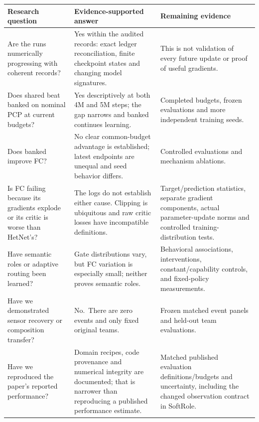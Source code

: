 \documentclass[
  10pt,
]{article}
\begin{document}
\begin{longtable}[]{@{}
  >{\raggedright\arraybackslash}p{}
  >{\raggedright\arraybackslash}p{}
  >{\raggedright\arraybackslash}p{}@{}}
\toprule\noalign{}
\begin{minipage}[b]{\linewidth}\raggedright
Research question
\end{minipage} & \begin{minipage}[b]{\linewidth}\raggedright
Evidence-supported answer
\end{minipage} & \begin{minipage}[b]{\linewidth}\raggedright
Remaining evidence
\end{minipage} \\
\midrule\noalign{}
\endhead
\bottomrule\noalign{}
\endlastfoot
Are the runs numerically progressing with coherent records? & Yes within
the audited records: exact ledger reconciliation, finite checkpoint
states and changing model signatures. & This is not validation of every
future update or proof of useful gradients. \\
Does shared beat banked on nominal PCP at current budgets? & Yes
descriptively at both 4M and 5M steps; the gap narrows and banked
continues learning. & Completed budgets, frozen evaluations and more
independent training seeds. \\
Does banked improve FC? & No clear common-budget advantage is
established; latest endpoints are unequal and seed behavior differs. &
Controlled evaluations and mechanism ablations. \\
Is FC failing because its gradients explode or its critic is worse than
HetNet's? & The logs do not establish either cause. Clipping is
ubiquitous and raw critic losses have incompatible definitions. &
Target/prediction statistics, separate gradient components, actual
parameter-update norms and controlled training-distribution tests. \\
Have semantic roles or adaptive routing been learned? & Gate
distributions vary, but FC variation is especially small; neither proves
semantic roles. & Behavioral associations, interventions,
constant/capability controls, and fixed-policy measurements. \\
Have we demonstrated sensor recovery or composition transfer? &
No.~There are zero events and only fixed original teams. & Frozen
matched event panels and held-out team evaluations. \\
Have we reproduced the paper's reported performance? & Domain recipes,
code provenance and numerical integrity are documented; that is narrower
than reproducing a published performance estimate. & Matched published
evaluation definitions/budgets and uncertainty, including the changed
observation contract in SoftRole. \\
\end{longtable}
\end{document}
